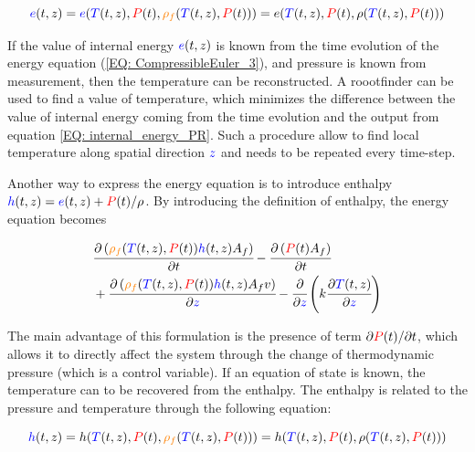 \documentclass[../Article_Model_Parameters.tex]{subfiles}
\begin{document}
			{\footnotesize
			\begin{equation}
				{\color{blue}e}(t,z)={\color{blue}e}({\color{blue}T}(t,z),{\color{red}P}(t),{\color{orange}\rho_f}({\color{blue}T}(t,z),{\color{red}P}(t)))=e( {\color{blue}T}(t,z),{\color{red}P}(t), \rho({\color{blue}T}(t,z),{\color{red}P}(t)) ) 
			\end{equation}
			}
		
			If the value of internal energy ${\color{blue}e}(t,z)$ is known from the time evolution of the energy equation (\ref{EQ: CompressibleEuler_3}), and pressure is known from measurement, then the temperature can be reconstructed. A roootfinder can be used to find a value of temperature, which minimizes the difference between the value of internal energy coming from the time evolution and the output from equation \ref{EQ: internal_energy_PR}. Such a procedure allow to find local temperature along spatial direction ${\color{blue}z}$ and needs to be repeated every time-step.
			
			Another way to express the energy equation is to introduce enthalpy ${\color{blue}h}(t,z) = {\color{blue}e}(t,z) + {\color{red}P}(t) / \rho$. By introducing the definition of enthalpy, the energy equation becomes
			
			{\footnotesize
				\begin{align}
					&\cfrac{\partial \left({\color{orange}\rho_f}({\color{blue}T}(t,z),{\color{red}P}(t)) {\color{blue}h}(t,z) A_f\right)}{\partial t} - \cfrac{\partial \left({\color{red}P}(t) A_f\right)}{\partial t} \nonumber \\
					&+ \cfrac{\partial \left( {\color{orange}\rho_f}({\color{blue}T}(t,z),{\color{red}P}(t)) {\color{blue}h}(t,z) A_f v \right)}{\partial {\color{blue}z}} - \cfrac{\partial}{\partial {\color{blue}z}} \left( k \cfrac{\partial {\color{blue}T}(t,z)}{\partial {\color{blue}z}} \right)
				\end{align}
			}
		
			The main advantage of this formulation is the presence of term $\partial {\color{red}P}(t) / \partial t $, which allows it to directly affect the system through the change of thermodynamic pressure (which is a control variable). If an equation of state is known, the temperature can to be recovered from the enthalpy. The enthalpy is related to the pressure and temperature through the following equation:
			
			{\footnotesize
				\begin{equation}
					{\color{blue}h}(t,z)=h({\color{blue}T}(t,z),{\color{red}P}(t),{\color{orange}\rho_f}({\color{blue}T}(t,z),{\color{red}P}(t)))=h( {\color{blue}T}(t,z),{\color{red}P}(t), \rho({\color{blue}T}(t,z),{\color{red}P}(t)) ) 
					\label{EQ:Enthalpy_root}
				\end{equation}
			}
		
\end{document}
